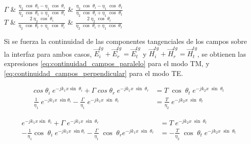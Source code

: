 \begin{table}
\begin{tabu}
		$\Gamma$
		&
		$\frac{\eta_2\; \cos\; \theta_t - \eta_1 \; \cos\; \theta_i}{\eta_2\; \cos\; \theta_t + \eta_1 \; \cos\; \theta_i}$
		&
		$\frac{\eta_2\; \cos\; \theta_i - \eta_1 \; \cos\; \theta_t}{\eta_2\; \cos\; \theta_i + \eta_1 \; \cos\; \theta_t}$
		\\
		$T$
		&
		$\frac{2 \;\eta_2 \; \cos\; \theta_i}{\eta_2\; \cos\; \theta_t + \eta_1 \; \cos\; \theta_i}$
		&
		$\frac{2\; \eta_2 \; \cos\; \theta_i}{\eta_2\; \cos\; \theta_i + \eta_1 \; \cos\; \theta_t}$
	\end{tabu}
	\caption{Campos incidentes, transmitidos y reflejados, y coeficientes de reflexión y transmisión para incidencia oblicua de una onda plana sobre una interfaz dieléctrica.}
	\label{table:incidencia_oblicua}
\end{table}

Si se fuerza la continuidad de las componentes tangenciales de los campos sobre la interfaz para ambos casos, $\vec{E}_i^{tg} + \vec{E}_r^{tg} = \vec{E}_t^{tg}$ y $\vec{H}_i^{tg} + \vec{H}_r^{tg} = \vec{H}_t^{tg}$, se obtienen las expresiones \ref{eq:continuidad_campos_paralelo} para el modo TM, y \ref{eq:continuidad_campos_perpendicular} para el modo TE.

\begin{equation}
	\begin{aligned}
		cos \; \theta_i \; e^{-j k_1 x \sin \; \theta_i} + \Gamma \; cos \; \theta_r \; e^{-j k_1 x \; \sin\; \theta_r} &= T\; \cos\; \theta_t \; e^{-j k_2 x \; \sin\; \theta_t}\\
		\frac{1}{\eta_1} \; e^{-j k_1 x \; \sin \theta_i} - \frac{\Gamma}{\eta_1} \; e^{-j k_1 x \; \sin \; \theta_r} &= \frac{T}{\eta_2} \; e^{-j k_2 x \; \sin\; \theta_t}
	\end{aligned}
	\label{eq:continuidad_campos_paralelo}
\end{equation}

\begin{equation}
	\begin{aligned}
		e^{-j k_1 x \sin \; \theta_i} + \Gamma \; e^{-j k_1 x \; \sin\; \theta_r} &= T\; e^{-j k_2 x \; \sin\; \theta_t}\\
		-\frac{1}{\eta_1} \cos\; \theta_i \; e^{-j k_1 x \; \sin \theta_i} - \frac{\Gamma}{\eta_1} \; \cos\; \theta_r e^{-j k_1 x \; \sin \; \theta_r} &= -\frac{T}{\eta_2} \; \cos\; \theta_t \; e^{-j k_2 x \; \sin\; \theta_t}
	\end{aligned}
	\label{eq:continuidad_campos_perpendicular}
\end{equation}

